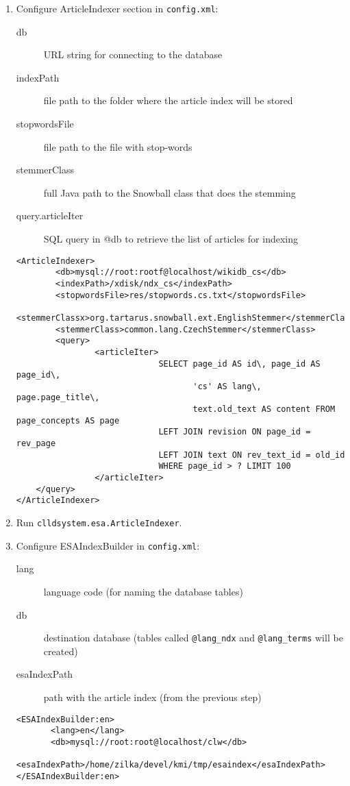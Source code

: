 \documentclass{article}
\begin{document}
\begin{enumerate}
\item Configure ArticleIndexer section in \verb|config.xml|:
  \begin{description}
    \item[db] URL string for connecting to the database
    \item[indexPath] file path to the folder where the article index will be stored
    \item[stopwordsFile] file path to the file with stop-words
    \item[stemmerClass] full Java path to the Snowball class that does the stemming
    \item[query.articleIter] SQL query in @db to retrieve the list of articles for indexing \\
    \end{description}
\begin{verbatim}
<ArticleIndexer>
        <db>mysql://root:rootf@localhost/wikidb_cs</db>
        <indexPath>/xdisk/ndx_cs</indexPath>
        <stopwordsFile>res/stopwords.cs.txt</stopwordsFile>
        <stemmerClassx>org.tartarus.snowball.ext.EnglishStemmer</stemmerClassx>
        <stemmerClass>common.lang.CzechStemmer</stemmerClass>
        <query>
                <articleIter>
                             SELECT page_id AS id\, page_id AS page_id\,
                                    'cs' AS lang\, page.page_title\,
                                    text.old_text AS content FROM page_concepts AS page
                             LEFT JOIN revision ON page_id = rev_page
                             LEFT JOIN text ON rev_text_id = old_id
                             WHERE page_id > ? LIMIT 100
                </articleIter>
	</query>
</ArticleIndexer>
\end{verbatim}


\item Run \verb|clldsystem.esa.ArticleIndexer|.
\item Configure ESAIndexBuilder in \verb|config.xml|:
  \begin{description}
  \item[lang] language code (for naming the database tables)
  \item[db] destination database (tables called \texttt{@lang\_ndx} and \texttt{@lang\_terms} will be created)
  \item[esaIndexPath] path with the article index (from the previous step)
  \end{description}
\begin{verbatim}
<ESAIndexBuilder:en>
       <lang>en</lang>
       <db>mysql://root:root@localhost/clw</db>
       <esaIndexPath>/home/zilka/devel/kmi/tmp/esaindex</esaIndexPath>
</ESAIndexBuilder:en>
\end{verbatim}


\end{enumerate}
\end{document}
